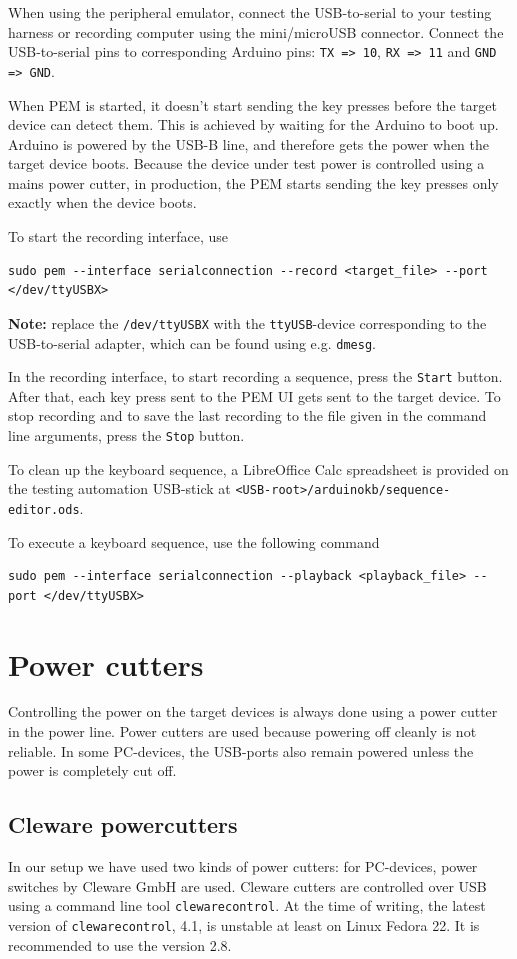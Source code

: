 \documentclass[a4paper,11pt]{article}
\newcommand{\note}{\textbf{Note: }}
\newcommand{\cmd}[1]{\texttt{#1}}
\begin{document}
When using the peripheral emulator, connect the USB-to-serial to your testing harness or recording computer using the mini/microUSB connector. Connect the USB-to-serial pins to corresponding Arduino pins: \cmd{TX => 10}, \cmd{RX => 11} and \cmd{GND => GND}.

When PEM is started, it doesn't start sending the key presses before the target device can detect them. This is achieved by waiting for the Arduino to boot up. Arduino is powered by the USB-B line, and therefore gets the power when the target device boots. Because the device under test power is controlled using a mains power cutter, in production, the PEM starts sending the key presses only exactly when the device boots.

To start the recording interface, use
\begin{lstlisting}
sudo pem --interface serialconnection --record <target_file> --port </dev/ttyUSBX>
\end{lstlisting}
\note replace the \cmd{/dev/ttyUSBX} with the \cmd{ttyUSB}-device corresponding to the USB-to-serial adapter, which can be found using e.g. \cmd{dmesg}.

In the recording interface, to start recording a sequence, press the \cmd{Start} button. After that, each key press sent to the PEM UI gets sent to the target device. To stop recording and to save the last recording to the file given in the command line arguments, press the  \cmd{Stop} button.

To clean up the keyboard sequence, a LibreOffice Calc spreadsheet is provided on the testing automation USB-stick at \cmd{<USB-root>/arduinokb/sequence-editor.ods}.

To execute a keyboard sequence, use the following command
\begin{lstlisting}
sudo pem --interface serialconnection --playback <playback_file> --port </dev/ttyUSBX>
\end{lstlisting}

\section{Power cutters}
\label{powercutters}
Controlling the power on the target devices is always done using a power cutter in the power line. Power cutters are used because powering off cleanly is not reliable. In some PC-devices, the USB-ports also remain powered unless the power is completely cut off.

\subsection{Cleware powercutters}
\label{clewarecutters}
In our setup we have used two kinds of power cutters: for PC-devices, power switches by Cleware GmbH are used. Cleware cutters are controlled over USB using a command line tool \cmd{clewarecontrol}. At the time of writing, the latest version of \cmd{clewarecontrol}, 4.1, is unstable at least on Linux Fedora 22. It is recommended to use the version 2.8.
\end{document}
